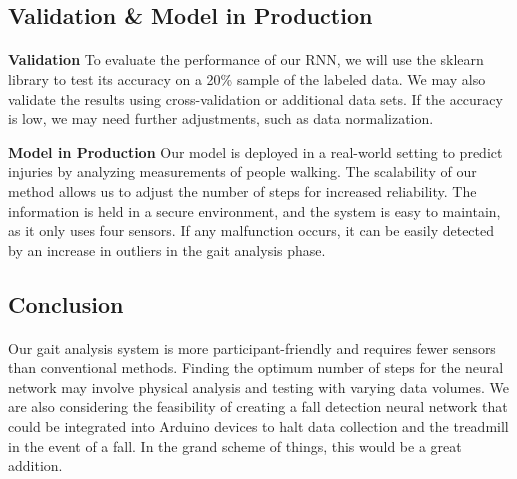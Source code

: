\subsection{Validation \& Model in Production}
\STANDARD{\insertsection}
{
\framesubtitle{\insertsubsection}

\textbf{Validation}
To evaluate the performance of our RNN, we will use the sklearn library to test its accuracy on a 20\% sample of the labeled data. We may also validate the results using cross-validation or additional data sets. If the accuracy is low, we may need further adjustments, such as data normalization.

\bigskip

\textbf{Model in Production}
Our model is deployed in a real-world setting to predict injuries by analyzing measurements of people walking. The scalability of our method allows us to adjust the number of steps for increased reliability. The information is held in a secure environment, and the system is easy to maintain, as it only uses four sensors. If any malfunction occurs, it can be easily detected by an increase in outliers in the gait analysis phase.
}


\subsection{Conclusion}
\STANDARD{\insertsection}
{
\framesubtitle{\insertsubsection}
Our gait analysis system is more participant-friendly and requires fewer sensors than conventional methods. Finding the optimum number of steps for the neural network may involve physical analysis and testing with varying data volumes. We are also considering the feasibility of creating a fall detection neural network that could be integrated into Arduino devices to halt data collection and the treadmill in the event of a fall. In the grand scheme of things, this would be a great addition.
}